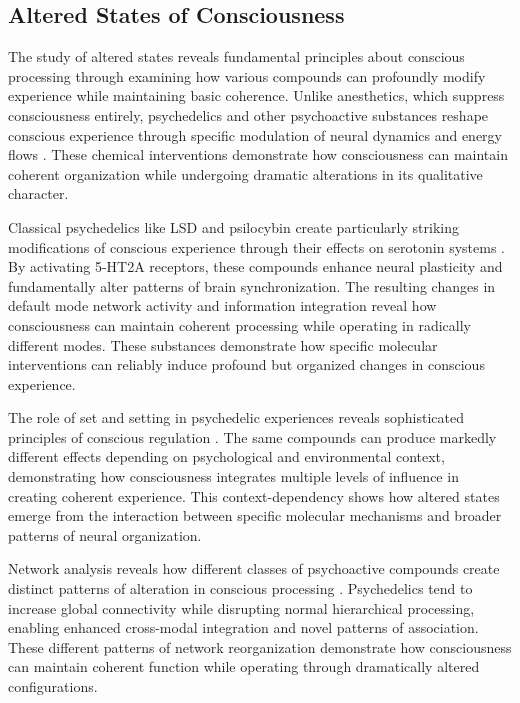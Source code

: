 \begin{refsection}
\section{Altered States of Consciousness}

The study of altered states reveals fundamental principles about conscious processing through examining how various compounds can profoundly modify experience while maintaining basic coherence. Unlike anesthetics, which suppress consciousness entirely, psychedelics and other psychoactive substances reshape conscious experience through specific modulation of neural dynamics and energy flows \cite{CarhartHarris2019}. These chemical interventions demonstrate how consciousness can maintain coherent organization while undergoing dramatic alterations in its qualitative character.

Classical psychedelics like LSD and psilocybin create particularly striking modifications of conscious experience through their effects on serotonin systems \cite{Nichols2016}. By activating 5-HT2A receptors, these compounds enhance neural plasticity and fundamentally alter patterns of brain synchronization. The resulting changes in default mode network activity and information integration reveal how consciousness can maintain coherent processing while operating in radically different modes. These substances demonstrate how specific molecular interventions can reliably induce profound but organized changes in conscious experience.

The role of set and setting in psychedelic experiences reveals sophisticated principles of conscious regulation \cite{Zinberg1984}. The same compounds can produce markedly different effects depending on psychological and environmental context, demonstrating how consciousness integrates multiple levels of influence in creating coherent experience. This context-dependency shows how altered states emerge from the interaction between specific molecular mechanisms and broader patterns of neural organization.

Network analysis reveals how different classes of psychoactive compounds create distinct patterns of alteration in conscious processing \cite{Preller2018}. Psychedelics tend to increase global connectivity while disrupting normal hierarchical processing, enabling enhanced cross-modal integration and novel patterns of association. These different patterns of network reorganization demonstrate how consciousness can maintain coherent function while operating through dramatically altered configurations.


\end{refsection}
